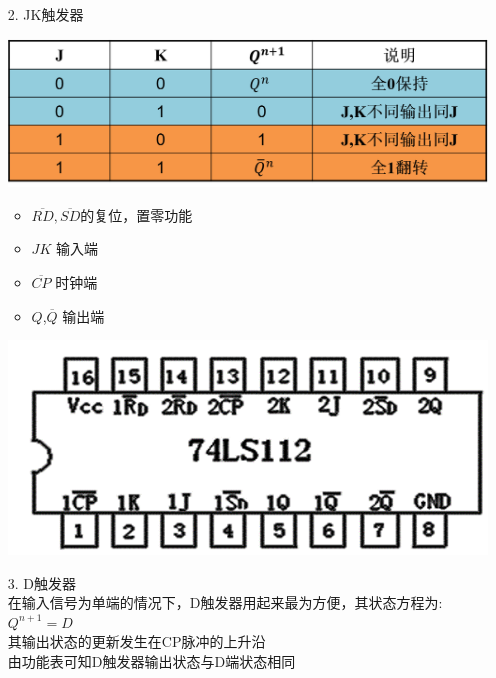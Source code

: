 \documentclass[UTF8]{ctexart}
\begin{document}
\begin{enumerate}
\begin{itemize}
                  \item [2.] JK触发器 \\
                        \begin{center}
                              \includegraphics[scale = 0.6]{3.png}
                        \end{center}

                        \begin{itemize}
                              \item $\overline{RD},\overline{SD}$的复位，置零功能
                              \item $JK$ 输入端
                              \item $\overline{CP}$ 时钟端
                              \item $Q$,$\overline{Q}$ 输出端
                        \end{itemize}
                        \begin{center}
                              \includegraphics[scale = 0.6]{4.png}
                        \end{center}

                  \item [3.] D触发器  \\
                        在输入信号为单端的情况下，D触发器用起来最为方便，其状态方程为:$Q^{n+1} = D$\\
                        其输出状态的更新发生在CP脉冲的上升沿\\
                        由功能表可知D触发器输出状态与D端状态相同\\
                        \begin{itemize}


\end{itemize}
\end{itemize}
\end{enumerate}
\end{document}
